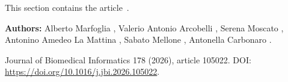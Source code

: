 
\noindent This section contains the article~\cite{marfoglia2026challenges}.

\begin{paperheader}
\textbf{Authors:} Alberto Marfoglia%
, Valerio Antonio Arcobelli%
, Serena Moscato%
, Antonino Amedeo La Mattina%
, Sabato Mellone%
, Antonella Carbonaro%
.\par
Journal of Biomedical Informatics 178 (2026), article 105022. DOI: \url{https://doi.org/10.1016/j.jbi.2026.105022}.
\end{paperheader}

